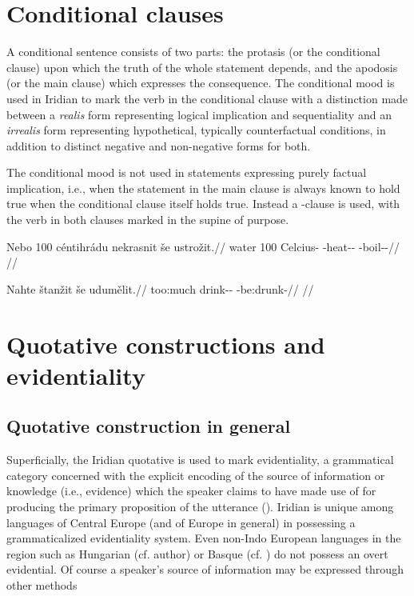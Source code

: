 \section{Conditional clauses}

A conditional sentence consists of two parts: the protasis (or the conditional
clause) upon which the truth of the whole statement depends, and the apodosis
(or the main clause) which expresses the consequence. The conditional mood is
used in Iridian to mark the verb in the conditional clause with a distinction
made between a \emph{realis} form representing logical implication and
sequentiality and an \emph{irrealis} form representing hypothetical, typically
counterfactual conditions, in addition to distinct negative and non-negative
forms for both.

The conditional mood is not used in statements expressing purely factual
implication, i.e., when the statement in the main clause is always known to hold
true when the conditional clause itself holds true. Instead a -clause is
used, with the verb in both clauses marked in the supine of purpose.

\pex
\begingl
\gla Nebo 100 céntihrádu nekrasnit še ustrožit.//
\glb water 100 Celcius-\Ins{} \Caus{}-heat-\Pv{}-\SupP{} \Com{} \Refl{}-boil-\Av{}-\SupP{}//
\glft {}//
\endgl
\xe

\pex
\begingl
\gla Nahte štanžit še udumělit.//
\glb too:much drink-\Av-\SupP{} \Com{} \Refl{}-be:drunk-\SupP{}//
\glft {}//
\endgl
\xe

\section{Quotative constructions and  evidentiality}\label{sec:reportedspeech}

\subsection{Quotative construction in general}

Superficially, the Iridian quotative is used to mark {\sc evidentiality}, a
grammatical category concerned with the explicit encoding of the source of
information or knowledge (i.e., evidence) which the speaker claims to have made
use of for producing the primary proposition of the utterance
(\cite[1-2]{diewald2010}). Iridian is unique among languages of Central Europe
(and of Europe in general) in possessing a grammaticalized evidentiality system.
Even non-Indo European languages in the region such as Hungarian (cf. author) or
Basque (cf. \cite{alcazar2010}) do not possess an overt evidential. Of course a
speaker’s source of information may be expressed through other methods 

